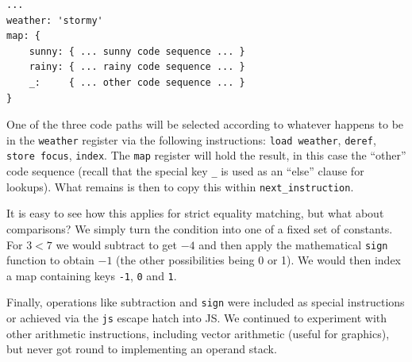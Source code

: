 \documentclass[ twoside,openright,titlepage,numbers=noenddot,headinclude,footinclude,cleardoublepage=empty,abstract=on,
                BCOR=5mm,paper=a4,fontsize=11pt
                ]{scrreprt}
\theoremstyle{definition}
\begin{document}
\begin{verbatim}
...
weather: 'stormy'
map: {
    sunny: { ... sunny code sequence ... }
    rainy: { ... rainy code sequence ... }
    _:     { ... other code sequence ... }
}
\end{verbatim}

One of the three code paths will be selected according to whatever
happens to be in the \texttt{weather} register via the following
instructions: \texttt{load\ weather}, \texttt{deref},
\texttt{store\ focus}, \texttt{index}. The \texttt{map} register will
hold the result, in this case the ``other'' code sequence (recall that
the special key \texttt{\_} is used as an ``else'' clause for lookups).
What remains is then to copy this within \texttt{next\_instruction}.

It is easy to see how this applies for strict equality matching, but
what about comparisons? We simply turn the condition into one of a fixed
set of constants. For \(3 < 7\) we would subtract to get \(-4\) and then
apply the mathematical \texttt{sign} function to obtain \(-1\) (the
other possibilities being 0 or 1). We would then index a map containing
keys \texttt{-1}, \texttt{0} and \texttt{1}.

Finally, operations like subtraction and \texttt{sign} were included as
special instructions or achieved via the \texttt{js} escape hatch into
\ac{JS}. We continued to experiment with other arithmetic instructions,
including vector arithmetic (useful for graphics), but never got round
to implementing an operand stack.
\end{document}
